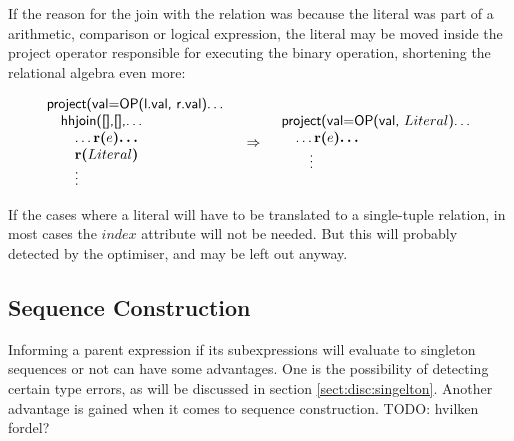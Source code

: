 If the reason for the join with the relation was because the literal was part of
a arithmetic, comparison or logical expression, the literal may be moved inside the \textsf{project} operator responsible for executing the
binary operation, shortening the relational algebra even more:

\begin{equation}
\begin{array}{lcr}
\begin{array}{l}
\mbox{\textsf{project(val=OP(l.val, r.val)\ldots}} \\ \quad
\mbox{\textsf{hhjoin([],[],\ldots}} \\ \quad \quad
\mbox{\textsf{\ldots}\textbf{r(}}e\mbox{\textbf{)\ldots}} \\ \quad \quad
\mbox{\textbf{r(}}Literal\mbox{\textbf{)}} \\
\mbox{\quad\quad\textsf{\vdots}}
\end{array}
&
\Rightarrow
&
\begin{array}{l}
\mbox{\textsf{project(val=OP(val, }}Literal\mbox{\textsf{)\ldots}} \\ \quad
\mbox{\textsf{\ldots}\textbf{r(}}e\mbox{\textbf{)\ldots}} \\
\mbox{\quad\quad\textsf{\vdots}}
\end{array}
\end{array}
\label{simpl:trans:TD:binLit}
\end{equation}

If the cases where a literal will have to be translated to a single-tuple relation, in most cases the $index$
attribute will not be needed. But this will probably detected by the optimiser, and may be left out anyway.

\subsection{Sequence Construction}
\label{sect:trans:TD:simpl:seq}

Informing a parent expression if its subexpressions will evaluate to singleton sequences or not can have some
advantages. One is the possibility of detecting certain type errors, as will be
discussed in section \ref{sect:disc:singelton}. Another advantage is gained
when it comes to sequence construction. TODO: hvilken fordel?

